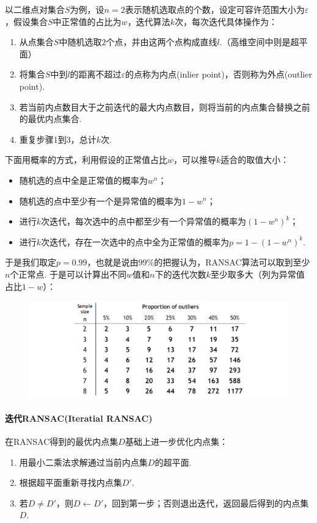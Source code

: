 \documentclass[12pt, a4paper, oneside]{ctexart}
\numberwithin{equation}{section}  %
\theoremstyle{definition}
\begin{document}
以二维点对集合$S$为例，设$n=2$表示随机选取点的个数，设定可容许范围大小为$\varepsilon$，假设集合$S$中正常值的占比为$w$，迭代算法$k$次，每次迭代具体操作为：
\begin{enumerate}
    \item 从点集合$S$中随机选取$2$个点，并由这两个点构成直线$l$.（高维空间中则是超平面）
    \item 将集合$S$中到$l$的距离不超过$\varepsilon$的点称为内点(inlier point)，否则称为外点(outlier point).
    \item 若当前内点数目大于之前迭代的最大内点数目，则将当前的内点集合替换之前的最优内点集合.
    \item 重复步骤1到3，总计$k$次.
\end{enumerate}
下面用概率的方式，利用假设的正常值占比$w$，可以推导$k$适合的取值大小：
\begin{itemize}
    \item 随机选的点中全是正常值的概率为$w^n$；
    \item 随机选的点中至少有一个是异常值的概率为$1-w^n$；
    \item 进行$k$次迭代，每次选中的点中都至少有一个异常值的概率为$(1-w^n)^k$；
    \item 进行$k$次迭代，存在一次选中的点中全为正常值的概率为$p=1-(1-w^n)^k$.
\end{itemize}
于是我们取定$p=0.99$，也就是说由$99\%$的把握认为，RANSAC算法可以取到至少$n$个正常点. 于是可以计算出不同$w$值和$n$下的迭代次数$k$至少取多大（列为异常值占比$1-w$）：
\begin{figure}[htbp]
    \centering
    \includegraphics[scale=0.4]{RANSAC迭代次数取值.png}
\end{figure}
\paragraph{迭代RANSAC(Iteratial RANSAC)} 在RANSAC得到的最优内点集$D$基础上进一步优化内点集：
\begin{enumerate}
    \item 用最小二乘法求解通过当前内点集$D$的超平面.
    \item 根据超平面重新寻找内点集$D'$.
    \item 若$D\neq D'$，则$D\leftarrow D'$，回到第一步；否则退出迭代，返回最后得到的内点集$D$.
\end{enumerate}
\end{document}
